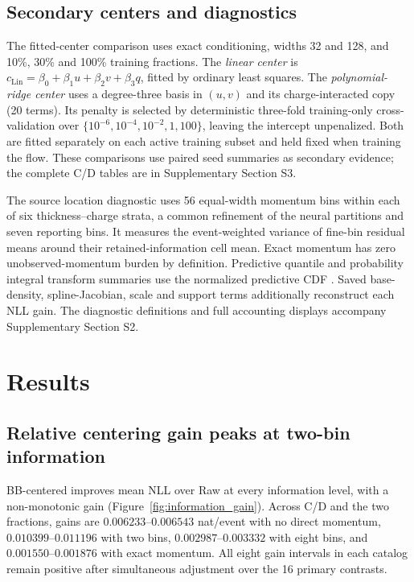 \documentclass[11pt]{article}
\newcommand{\simple}{\mathrm{Lin}}
\begin{document}
\subsection{Secondary centers and diagnostics}

The fitted-center comparison uses exact conditioning, widths 32 and 128, and
10\%, 30\% and 100\% training fractions. The \emph{linear center} is
$c_{\simple}=\beta_0+\beta_1u+\beta_2v+\beta_3q$, fitted by ordinary least
squares. The \emph{polynomial-ridge center} uses a degree-three basis in
$(u,v)$ and its charge-interacted copy (20 terms). Its penalty is selected
by deterministic three-fold training-only cross-validation over
$\{10^{-6},10^{-4},10^{-2},1,100\}$, leaving the intercept unpenalized.
Both are fitted separately on each active training subset and held fixed
when training the flow. These comparisons use paired seed summaries as
secondary evidence; the complete C/D tables are in Supplementary Section S3.

The source location diagnostic uses 56 equal-width momentum bins within each
of six thickness--charge strata, a common refinement of the neural partitions
and seven reporting bins. It measures the event-weighted variance of fine-bin
residual means around their retained-information cell mean. Exact momentum
has zero unobserved-momentum burden by definition. Predictive quantile and
probability integral transform summaries use the normalized predictive CDF
\citep{GneitingBalabdaouiRaftery2007}. Saved base-density, spline-Jacobian,
scale and support terms additionally reconstruct each NLL gain. The diagnostic
definitions and full accounting displays accompany Supplementary Section S2.

\section{Results}

\subsection{Relative centering gain peaks at two-bin information}
\label{sec:information_results}

BB-centered improves mean NLL over Raw at every information level, with a
non-monotonic gain (Figure~\ref{fig:information_gain}). Across C/D and the
two fractions, gains are $0.006233$--$0.006543$ nat/event with no direct
momentum, $0.010399$--$0.011196$ with two bins, $0.002987$--$0.003332$
with eight bins, and $0.001550$--$0.001876$ with exact momentum.
All eight gain intervals in each catalog remain positive after simultaneous
adjustment over the 16 primary contrasts.
\end{document}
